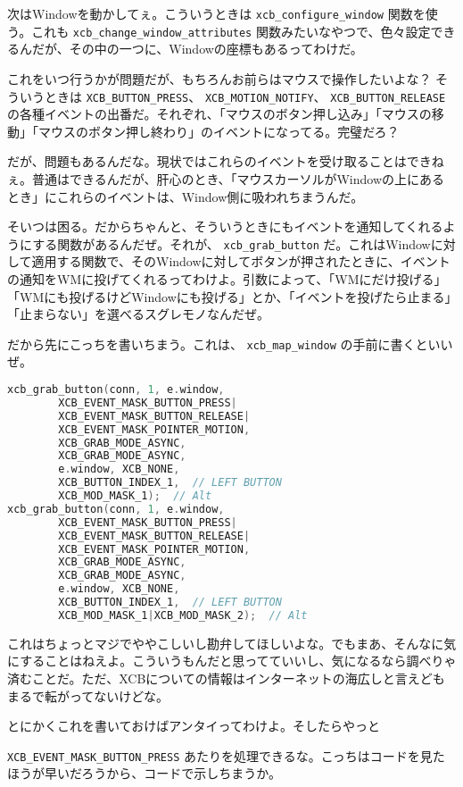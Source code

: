 \documentclass[12pt,a4paper]{jsarticle}
\begin{document}
次はWindowを動かしてぇ。こういうときは \lstinline{xcb_configure_window} 関数を使う。これも \lstinline{xcb_change_window_attributes} 関数みたいなやつで、色々設定できるんだが、その中の一つに、Windowの座標もあるってわけだ。

これをいつ行うかが問題だが、もちろんお前らはマウスで操作したいよな？ そういうときは \lstinline{XCB_BUTTON_PRESS}、 \lstinline{XCB_MOTION_NOTIFY}、 \lstinline{XCB_BUTTON_RELEASE}の各種イベントの出番だ。それぞれ、「マウスのボタン押し込み」「マウスの移動」「マウスのボタン押し終わり」のイベントになってる。完璧だろ？

だが、問題もあるんだな。現状ではこれらのイベントを受け取ることはできねぇ。普通はできるんだが、肝心のとき、「マウスカーソルがWindowの上にあるとき」にこれらのイベントは、Window側に吸われちまうんだ。

そいつは困る。だからちゃんと、そういうときにもイベントを通知してくれるようにする関数があるんだぜ。それが、 \lstinline{xcb_grab_button} だ。これはWindowに対して適用する関数で、そのWindowに対してボタンが押されたときに、イベントの通知をWMに投げてくれるってわけよ。引数によって、「WMにだけ投げる」「WMにも投げるけどWindowにも投げる」とか、「イベントを投げたら止まる」「止まらない」を選べるスグレモノなんだぜ。

だから先にこっちを書いちまう。これは、 \lstinline{xcb_map_window} の手前に書くといいぜ。

\begin{lstlisting}[language=C++]
xcb_grab_button(conn, 1, e.window,
		XCB_EVENT_MASK_BUTTON_PRESS|
		XCB_EVENT_MASK_BUTTON_RELEASE|
		XCB_EVENT_MASK_POINTER_MOTION,
		XCB_GRAB_MODE_ASYNC,
		XCB_GRAB_MODE_ASYNC,
		e.window, XCB_NONE,
		XCB_BUTTON_INDEX_1,  // LEFT BUTTON
		XCB_MOD_MASK_1);  // Alt
xcb_grab_button(conn, 1, e.window,
		XCB_EVENT_MASK_BUTTON_PRESS|
		XCB_EVENT_MASK_BUTTON_RELEASE|
		XCB_EVENT_MASK_POINTER_MOTION,
		XCB_GRAB_MODE_ASYNC,
		XCB_GRAB_MODE_ASYNC,
		e.window, XCB_NONE,
		XCB_BUTTON_INDEX_1,  // LEFT BUTTON
		XCB_MOD_MASK_1|XCB_MOD_MASK_2);  // Alt
\end{lstlisting}

これはちょっとマジでややこしいし勘弁してほしいよな。でもまあ、そんなに気にすることはねえよ。こういうもんだと思ってていいし、気になるなら調べりゃ済むことだ。ただ、XCBについての情報はインターネットの海広しと言えどもまるで転がってないけどな。

とにかくこれを書いておけばアンタイってわけよ。そしたらやっと \raggedright\lstinline{XCB_EVENT_MASK_BUTTON_PRESS} あたりを処理できるな。こっちはコードを見たほうが早いだろうから、コードで示しちまうか。
\end{document}
